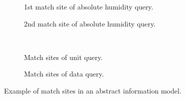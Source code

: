\begin{figure}[tbp]
  \centering
  \begin{subfigure}[b]{0.48\textwidth}
    \caption{1st match site of absolute humidity query.}
    \label{fig:topics:info:match:absI}
  \end{subfigure}
  \hfill
  \begin{subfigure}[b]{0.48\textwidth}
    \caption{2nd match site of absolute humidity query.}
    \label{fig:topics:info:match:absII}
  \end{subfigure}
  \\
  \begin{subfigure}[b]{0.48\textwidth}
    \caption{Match sites of unit query.}
    \label{fig:topics:info:match:unit}
  \end{subfigure}
  \hfill
  \begin{subfigure}[b]{0.48\textwidth}
    \caption{Match sites of data query.}
    \label{fig:topics:info:match:data}
  \end{subfigure}
  
  \caption[Example of match sites in an abstract information model]{Example of match sites in an abstract information model.}
  \label{fig:topics:info:match}
\end{figure}

